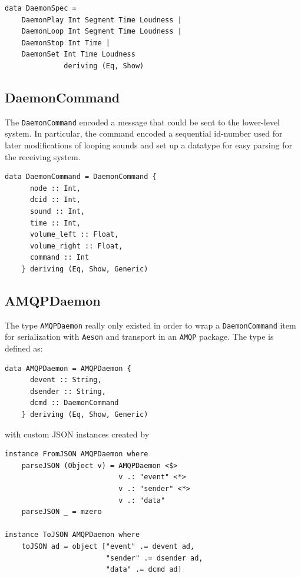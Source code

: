 \begin{verbatim}
data DaemonSpec = 
    DaemonPlay Int Segment Time Loudness |
    DaemonLoop Int Segment Time Loudness |
    DaemonStop Int Time |
    DaemonSet Int Time Loudness 
              deriving (Eq, Show)
\end{verbatim}

\subsection{DaemonCommand}
\label{sec:daemoncommand}

The \texttt{DaemonCommand} encoded a message that could be sent to the
lower-level system. In particular, the command encoded a sequential
id-number used for later modifications of looping sounds and set up
a datatype for easy parsing for the receiving system.

\begin{verbatim}
data DaemonCommand = DaemonCommand {
      node :: Int,
      dcid :: Int,
      sound :: Int,
      time :: Int,
      volume_left :: Float,
      volume_right :: Float,
      command :: Int
    } deriving (Eq, Show, Generic)
\end{verbatim}

\subsection{AMQPDaemon}
\label{sec:amqpdaemon}

The type \texttt{AMQPDaemon} really only existed in order to wrap a
\texttt{DaemonCommand} item for serialization with \texttt{Aeson} and
transport in an \texttt{AMQP} package. The type is defined as:
\begin{verbatim}
data AMQPDaemon = AMQPDaemon {
      devent :: String,
      dsender :: String,
      dcmd :: DaemonCommand
    } deriving (Eq, Show, Generic)
\end{verbatim}
with custom JSON instances created by
\begin{verbatim}
instance FromJSON AMQPDaemon where
    parseJSON (Object v) = AMQPDaemon <$> 
                           v .: "event" <*>
                           v .: "sender" <*>
                           v .: "data"
    parseJSON _ = mzero

instance ToJSON AMQPDaemon where
    toJSON ad = object ["event" .= devent ad, 
                        "sender" .= dsender ad,
                        "data" .= dcmd ad]
\end{verbatim}

